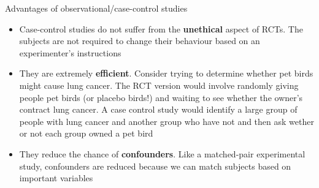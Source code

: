 \documentclass[12pt,xcolor=dvipsnames,handout,mathserif,aspectratio=169]{beamer}
\newcommand{\bre}[1]{{\color{red} \textbf{#1}}}
\newcommand{\bgr}[1]{{\color{PineGreen} \textbf{#1}}}
\begin{document}
\begin{frame}{Advantages of observational/case-control studies }

\begin{itemize}
\item Case-control studies do not suffer from the \bre{unethical} aspect of RCTs. The subjects are not required to change their behaviour based on an experimenter's instructions
\pause
\item They are extremely \bgr{efficient}. Consider trying to determine whether pet birds might cause lung cancer. The RCT version would involve randomly giving people pet birds (or placebo birds!) and waiting to see whether the owner's contract lung cancer. A case control study would identify a large group of people with lung cancer and another group who have not and then ask wether or not each group owned a pet bird
\pause
\item They reduce the chance of \bre{confounders}. Like a matched-pair experimental study, confounders are reduced because we can match subjects based on important variables
\end{itemize}

\end{frame}
\end{document}

